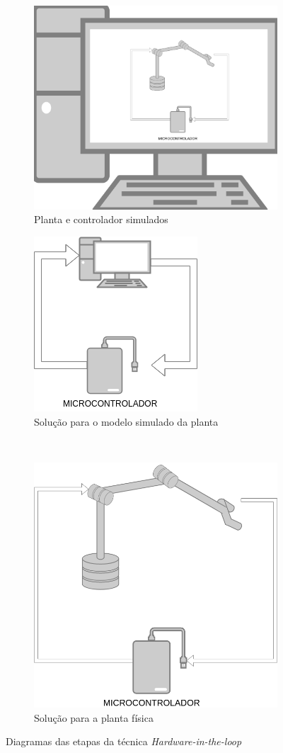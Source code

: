 \begin{figure}[h!]
  
  \centering
  \begin{subfigure}{.5\textwidth}
    \centering
    \includegraphics[width = 0.6\columnwidth]{Imagens/plantaSimulada.png}
    \caption{Planta e controlador simulados}
    \label{fig:plantaSimulada}
  \end{subfigure}%
  \begin{subfigure}{.5\textwidth}
    \centering
    \includegraphics[width = 0.5\columnwidth]{Imagens/solucaoModelo.png}
    \caption{Solução para o modelo simulado da planta}
    \label{fig:solucaoModelo}
  \end{subfigure}%
  \\[5ex]
  \begin{subfigure}{\textwidth}
    \centering
    \includegraphics[width = 0.4\columnwidth]{Imagens/solucaoPlanta.png}
    \caption{Solução para a planta física}
    \label{fig:solucaoPlanta}
  \end{subfigure}%
  \caption{Diagramas das etapas da técnica \textit{Hardware-in-the-loop}}
  
  \label{fig:simulacoes} 

\end{figure}

